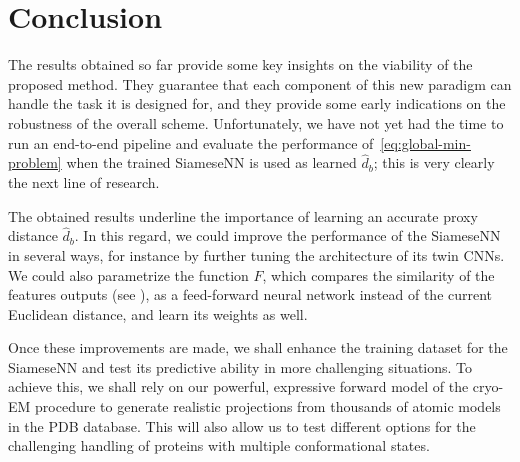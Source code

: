 \section{Conclusion}

The results obtained so far provide some key insights on the viability of the proposed method. They guarantee that each component of this new paradigm can handle the task it is designed for, and they provide some early indications on the robustness of the overall scheme. Unfortunately, we have not yet had the time to run an end-to-end pipeline and evaluate the performance of~\eqref{eq:global-min-problem} when the trained SiameseNN is used as learned $\widehat{d}_b$; this is very clearly the next line of research.

The obtained results underline the importance of learning an accurate proxy distance $\widehat{d}_b$. In this regard, we could improve the performance of the SiameseNN in several ways, for instance by further tuning the architecture of its twin CNNs. We could also parametrize the function $F$, which compares the similarity of the features outputs (see ), as a feed-forward neural network instead of the current Euclidean distance, and learn its weights as well.

Once these improvements are made, we shall enhance the training dataset for the SiameseNN and test its predictive ability in more challenging situations. To achieve this, we shall rely on our powerful, expressive forward model of the cryo-EM procedure to generate realistic projections from thousands of atomic models in the PDB database. This will also allow us to test different options for the challenging handling of proteins with multiple conformational states.

